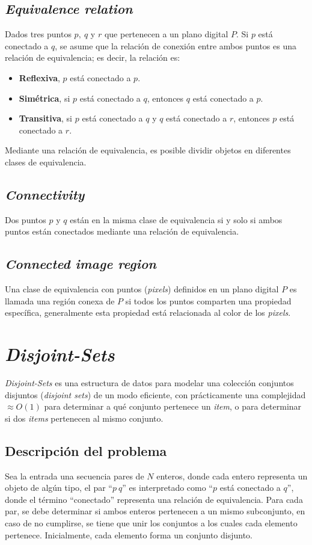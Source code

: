 \subsection{\textit{Equivalence relation}}
Dados tres puntos $p,~q$ y $r$ que pertenecen a un plano digital $P$. Si $p$
está conectado a $q$, se asume que la relación de conexión entre ambos puntos
es una relación de equivalencia\cite{Biswas:2010:IsoCovers}; es decir, la 
relación es:
\begin{itemize}
  \item \textbf{Reflexiva}, $p$ está conectado a $p$.
  \item \textbf{Simétrica}, si $p$ está conectado a $q$, entonces $q$ está 
  conectado a $p$.
  \item \textbf{Transitiva}, si $p$ está conectado a $q$ y $q$ está conectado 
  a $r$, entonces $p$ está conectado a $r$.
\end{itemize}

Mediante una relación de equivalencia, es posible dividir objetos en
diferentes clases de equivalencia.

\subsection{\textit{Connectivity}}
Dos puntos $p$ y $q$ están en la misma clase de equivalencia si y solo si
ambos puntos están conectados mediante una relación de equivalencia.

\subsection{\textit{Connected image region}}
Una clase de equivalencia con puntos (\textit{pixels}) definidos en un plano
digital $P$ es llamada una región conexa de $P$ si todos los puntos comparten 
una propiedad específica, generalmente esta propiedad está relacionada al
color de los \textit{pixels}. 

\section{\textit{Disjoint-Sets}}
\textit{Disjoint-Sets} es una estructura de datos para modelar una colección
conjuntos disjuntos (\textit{disjoint sets}) de un modo eficiente, con
prácticamente una complejidad $\approx O(1)$ para determinar a qué conjunto 
pertenece un \textit{item}, o para determinar si dos \textit{items} pertenecen
al mismo conjunto.

\subsection{Descripción del problema}
Sea la entrada una secuencia pares de $N$ enteros, donde cada entero 
representa un objeto de algún tipo, el par ``$p~q$'' es interpretado como 
``$p$ está conectado a $q$'', donde el término ``conectado'' representa una 
relación de equivalencia. Para cada par, se debe determinar si ambos enteros
pertenecen a un mismo subconjunto, en caso de no cumplirse, se tiene que unir 
los conjuntos a los cuales cada elemento pertenece. Inicialmente, cada 
elemento forma un conjunto disjunto.

